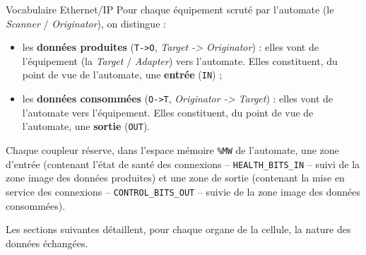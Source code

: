 \begin{UPSTIinfor}{Vocabulaire Ethernet/IP}
Pour chaque équipement scruté par l'automate (le \emph{Scanner} /
\emph{Originator}), on distingue :
\begin{itemize}
    \item les \textbf{données produites} (\texttt{T->O}, \emph{Target ->
    Originator}) : elles vont de l'équipement (la \emph{Target} /
    \emph{Adapter}) vers l'automate. Elles constituent, du point de vue de
    l'automate, une \textbf{entrée} (\texttt{IN}) ;
    \item les \textbf{données consommées} (\texttt{O->T}, \emph{Originator
    -> Target}) : elles vont de l'automate vers l'équipement. Elles
    constituent, du point de vue de l'automate, une \textbf{sortie}
    (\texttt{OUT}).
\end{itemize}
\end{UPSTIinfor}

Chaque coupleur réserve, dans l'espace mémoire \texttt{\%MW} de l'automate,
une zone d'entrée (contenant l'état de santé des connexions --
\texttt{HEALTH\_BITS\_IN} -- suivi de la zone image des données produites)
et une zone de sortie (contenant la mise en service des connexions --
\texttt{CONTROL\_BITS\_OUT} -- suivie de la zone image des données
consommées).

Les sections suivantes détaillent, pour chaque organe de la cellule, la
nature des données échangées.
